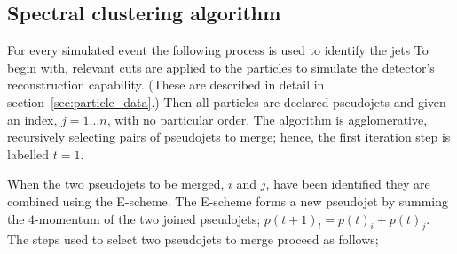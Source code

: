 \subsection{Spectral clustering algorithm}\label{sec:spectralmethodalgo}
    For every simulated event the following process is used to identify the jets
    To begin with, relevant cuts are applied to the particles to simulate the detector's
    reconstruction capability.
    (These are described in detail in section~\ref{sec:particle_data}.)
    Then all particles are declared pseudojets  and given an index, \(j = 1 \dots n\), with no particular order.
    The algorithm is agglomerative, recursively selecting pairs of pseudojets to merge;
    hence, the first iteration step is labelled \(t=1\).

    When the two pseudojets to be merged, \(i\) and \(j\), have been identified they are combined
    using the E-scheme.
    The E-scheme forms a new pseudojet by summing the \(4\)-momentum of the two joined pseudojets;
    \(p(t+1)_l = p(t)_i + p(t)_j\).
    The steps used to select two pseudojets to merge proceed as follows;


